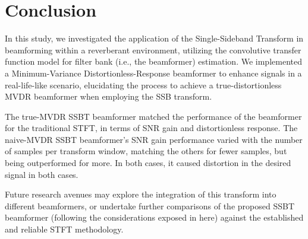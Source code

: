 \section{Conclusion}
\label{sec:conclusion}

In this study, we investigated the application of the Single-Sideband Transform in beamforming within a reverberant environment, utilizing the convolutive transfer function model for filter bank (i.e., the beamformer) estimation. We implemented a Minimum-Variance Distortionless-Response beamformer to enhance signals in a real-life-like scenario, elucidating the process to achieve a true-distortionless MVDR beamformer when employing the SSB transform.

The true-MVDR SSBT beamformer matched the performance of the beamformer for the traditional STFT, in terms of SNR gain and distortionless response. The naive-MVDR SSBT beamformer's SNR gain performance varied with the number of samples per transform window, matching the others for fewer samples, but being outperformed for more. In both cases, it caused distortion in the desired signal in both cases.

Future research avenues may explore the integration of this transform into different beamformers, or undertake further comparisons of the proposed SSBT beamformer (following the considerations exposed in here) against the established and reliable STFT methodology.